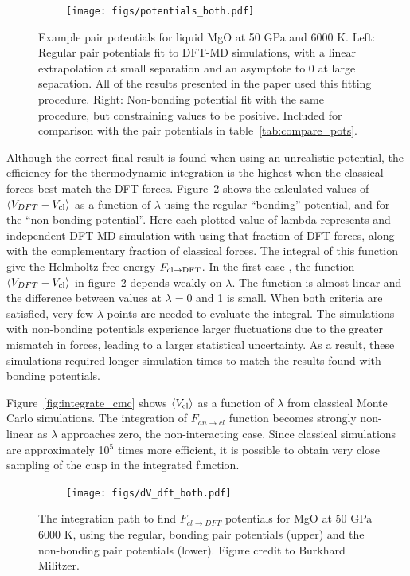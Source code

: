 \begin{figure}[h!]  
    \centering
    \texttt{[image: figs/potentials\_both.pdf]}
\caption{Example pair potentials for liquid MgO at 50 GPa and 6000 K. Left: 
  Regular pair potentials fit to DFT-MD simulations, with a linear
  extrapolation at small separation and an asymptote to 0 at large
  separation.  All of the results presented in the paper used this fitting
  procedure. Right: Non-bonding potential fit with the same procedure, but
  constraining values to be positive. Included for comparison with the pair
  potentials in table~\ref{tab:compare_pots}.}
\label{fig:potentials}
\end{figure}


Although the correct final result is found when using an unrealistic
potential, the efficiency for the thermodynamic integration is the highest
when the classical forces best match the DFT forces.
Figure~\ref{fig:integrate_dft} shows the calculated values of $\left<
V_{DFT} - V_{\rm cl} \right>$ as a function of $\lambda$ using the regular
``bonding'' potential, and for the ``non-bonding potential''. Here each
plotted value of lambda represents and independent DFT-MD simulation with
using that fraction of DFT forces, along with the complementary fraction of
classical forces. The integral of this function give the Helmholtz free
energy $F_{\rm cl \to DFT}$. In the first case , the function $\left<
V_{DFT}-V_{\rm cl}\right>$ in figure~\ref{fig:integrate_dft} depends weakly
on $\lambda$. The function is almost linear and the difference between
values at $\lambda=0$ and 1 is small. When both criteria are satisfied,
very few $\lambda$ points are needed to evaluate the integral. The
simulations with non-bonding potentials experience larger fluctuations  due
to the greater mismatch in forces, leading to a larger statistical
uncertainty.  As a result, these simulations required longer simulation
times to match the results found with bonding potentials.

Figure~\ref{fig:integrate_cmc} shows $\left< V_{\rm cl} \right>$ as a function
of $\lambda$ from classical Monte Carlo simulations. The integration of
$F_{an \to cl}$ function becomes strongly non-linear as $\lambda$
approaches zero, the non-interacting case. Since classical simulations are
approximately 10$^5$ times more efficient, it is possible to obtain very
close sampling of the cusp in the integrated function. 

\begin{figure}[h!]  
  \centering
    \texttt{[image: figs/dV\_dft\_both.pdf]}
\caption{The integration path to find $F_{cl \to DFT}$ potentials for MgO
at 50 GPa 6000 K, using the regular, bonding pair potentials (upper) and
the non-bonding pair potentials (lower). Figure credit to Burkhard Militzer. }
\label{fig:integrate_dft}
\end{figure}

